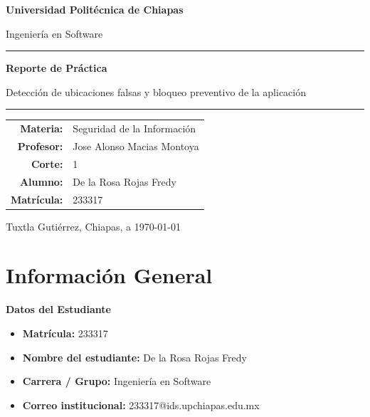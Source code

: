 \documentclass[12pt, a4paper]{article}
\newcommand{\nombreuniversidad}{Universidad Politécnica de Chiapas}
\newcommand{\nombrecarrera}{Ingeniería en Software}
\newcommand{\nombremateria}{Seguridad de la Información}
\newcommand{\nombreprofesor}{Jose Alonso Macias Montoya}
\newcommand{\corte}{1}
\newcommand{\actividad}{Detección de ubicaciones falsas y bloqueo preventivo de la aplicación}
\newcommand{\nombres}{De la Rosa Rojas Fredy}
\newcommand{\matricula}{233317}
\newcommand{\fechaentrega}{\today}
\newcommand{\ciudad}{Tuxtla Gutiérrez, Chiapas}
\begin{document}
\begin{titlepage}
\thispagestyle{portada}
\centering

    \vspace*{2cm}
    {\LARGE\bfseries \nombreuniversidad \par}
    \vspace{0.4cm}
    {\large \nombrecarrera \par}

    \vspace{2.5cm}
    \rule{\textwidth}{1.5pt}
    \vspace{0.5cm}
    {\Large\bfseries Reporte de Práctica \par}
    \vspace{0.3cm}
    {\large \actividad \par}
    \vspace{0.5cm}
    \rule{\textwidth}{1.5pt}

    \vspace{3cm}

    \begin{tabular}{rl}
        \textbf{Materia:}    & \nombremateria \\[6pt]
        \textbf{Profesor:}   & \nombreprofesor \\[6pt]
        \textbf{Corte:}      & \corte \\[18pt]
        \textbf{Alumno:}     & \nombres \\[6pt]
        \textbf{Matrícula:}  & \matricula \\
    \end{tabular}

    \vfill

    {\normalsize \ciudad, a \fechaentrega}

\end{titlepage}

\clearpage
\tableofcontents
\clearpage


\section*{Información General}

\textbf{Datos del Estudiante}
\begin{itemize}[noitemsep, topsep=4pt]
    \item \textbf{Matrícula:} \matricula
    \item \textbf{Nombre del estudiante:} \nombres
    \item \textbf{Carrera / Grupo:} \nombrecarrera
    \item \textbf{Correo institucional:} 233317@ids.upchiapas.edu.mx
\end{itemize}
\end{document}
